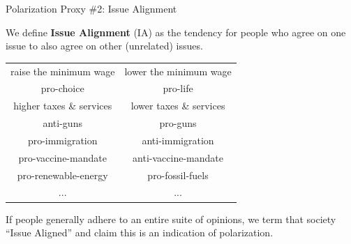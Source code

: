 \documentclass[12pt]{beamer}
\begin{document}
\begin{frame}[c]{Polarization Proxy \#2: Issue Alignment} %

We define \textbf{Issue Alignment} (IA) as the tendency for people who agree on
one issue to also agree on other (unrelated) issues.

\begin{center}
\begin{tabular}{c|c}
\pause
raise the minimum wage & lower the minimum wage \\
\pause
pro-choice & pro-life \\
\pause
higher taxes \& services & lower taxes \& services \\
\pause
anti-guns & pro-guns \\
\pause
pro-immigration & anti-immigration \\
\pause
pro-vaccine-mandate & anti-vaccine-mandate \\
\pause
pro-renewable-energy & pro-fossil-fuels \\
\pause
... & ... \\
\end{tabular}
\end{center}

\pause
\footnotesize

If people generally adhere to an entire suite of opinions, we term that society
``Issue Aligned'' and claim this is an indication of polarization.

\end{frame}
\end{document}
